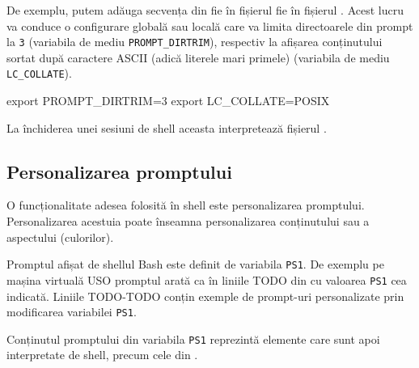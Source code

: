 De exemplu, putem adăuga secvența din  fie în fișierul  fie în fișierul . Acest lucru va conduce o configurare globală sau locală care va limita directoarele din prompt la \texttt{3} (variabila de mediu \texttt{PROMPT\_DIRTRIM}), respectiv la afișarea conținutului sortat după caractere ASCII (adică literele mari primele) (variabila de mediu \texttt{LC\_COLLATE}).

\begin{screen}[caption={Configurare în Bash (bashrc)},label={lst:cli:config-bashrc}]
export PROMPT_DIRTRIM=3
export LC_COLLATE=POSIX
\end{screen}

La închiderea unei sesiuni de shell aceasta interpretează fișierul .

\subsection{Personalizarea promptului}
\label{sec:cli:shell-start:prompt}

O funcționalitate adesea folosită în shell este personalizarea promptului.
Personalizarea acestuia poate înseamna personalizarea conținutului sau a
aspectului (culorilor).

Promptul afișat de shellul Bash este definit de variabila \texttt{PS1}. De exemplu pe
mașina virtuală USO promptul arată ca în liniile TODO din  cu valoarea \texttt{PS1} cea indicată. Liniile TODO-TODO conțin exemple de prompt-uri personalizate prin modificarea variabilei \texttt{PS1}.

\begin{screen}[caption={Personalizarea prompt-ului},label={lst:cli:custom-prompt}]
student@uso:~$
student@uso:~$ echo $PS1
${debian_chroot:+($debian_chroot)}\[\033[01;32m\]\u@\h\[\033[00m\]:\[\033[01;34m\]\w\[\033[00m\]\$
\end{screen}

Conținutul promptului din variabila \texttt{PS1} reprezintă elemente care sunt apoi
interpretate de shell, precum cele din .

